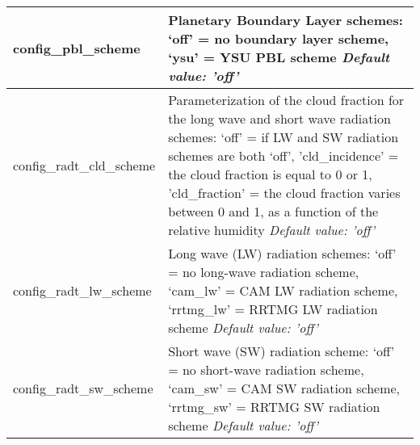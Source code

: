 {\begin{longtable}{|p{2.0in} |p{4.25in}|}
  config\_pbl\_scheme & Planetary Boundary Layer schemes: \newline
                                             `off' = no boundary layer scheme, \newline
                                             `ysu' = YSU PBL scheme \newline 
  {\em Default value: 'off'} \\ \hline

  config\_radt\_cld\_scheme & Parameterization of the cloud fraction for the long wave and short wave radiation schemes: \newline
                                              `off' = if LW and SW radiation schemes are both `off', \newline
                                              'cld\_incidence' = the cloud fraction is equal to 0 or 1, \newline
                                              'cld\_fraction' = the cloud fraction varies between 0 and 1,  as a function of the relative humidity \newline
   {\em Default value: 'off'} \\ \hline

  config\_radt\_lw\_scheme & Long wave (LW) radiation schemes: \newline
                                             `off' = no long-wave radiation scheme, \newline
                                             `cam\_lw' = CAM LW radiation scheme, \newline 
                                             `rrtmg\_lw' = RRTMG LW radiation scheme \newline
  {\em Default value: 'off'} \\ \hline

  config\_radt\_sw\_scheme & Short wave (SW) radiation scheme: \newline
                                             `off' = no short-wave radiation scheme, \newline
                                             `cam\_sw' = CAM SW radiation scheme, \newline
                                             `rrtmg\_sw' = RRTMG SW radiation scheme \newline                                                                                           
  {\em Default value: 'off'} \\ \hline


\end{longtable}}
